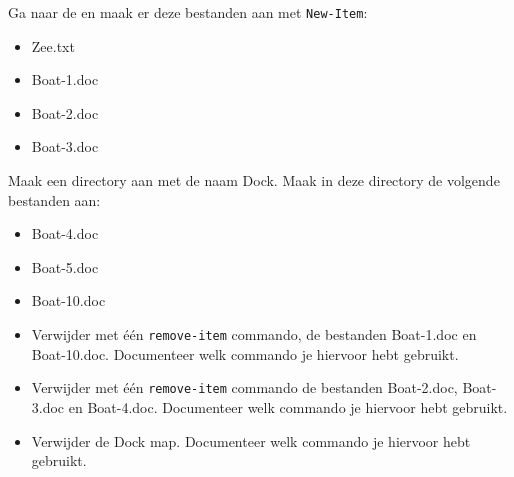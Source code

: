 Ga naar de  en maak er deze bestanden aan met \texttt{New-Item}:
\begin{itemize}
\item Zee.txt
\item Boat-1.doc
\item Boat-2.doc
\item Boat-3.doc
\end{itemize}

Maak een directory aan met de naam Dock. Maak in deze directory de volgende bestanden aan:
\begin{itemize}
\item Boat-4.doc
\item Boat-5.doc
\item Boat-10.doc
\end{itemize}

\begin{itemize}
\item Verwijder met \'e\'en \texttt{remove-item} commando, de bestanden Boat-1.doc en Boat-10.doc. Documenteer welk commando je hiervoor hebt gebruikt.
\item Verwijder met \'e\'en \texttt{remove-item} commando de bestanden Boat-2.doc, Boat-3.doc en Boat-4.doc. Documenteer welk commando je hiervoor hebt gebruikt.
\item Verwijder de Dock map. Documenteer welk commando je hiervoor hebt gebruikt.
\end{itemize}

